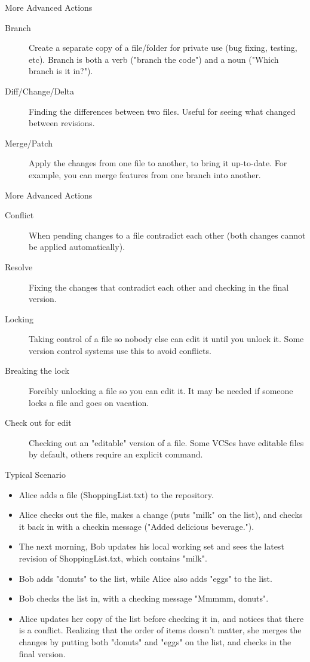 \begin{frame}{More Advanced Actions}
\begin{description}
\item[Branch] Create a separate copy of a file/folder for private
  use (bug fixing, testing, etc). Branch is both a verb ("branch the
  code") and a noun ("Which branch is it in?").
\item[Diff/Change/Delta] Finding the differences between two
  files. Useful for seeing what changed between revisions.
\item[Merge/Patch] Apply the changes from one file to another, to
  bring it up-to-date. For example, you can merge features from one
  branch into another.
\end{description}
\end{frame}
\begin{frame}{More Advanced Actions}
\begin{description}
\item[Conflict] When pending changes to a file contradict each
  other (both changes cannot be applied automatically).
\item[Resolve] Fixing the changes that contradict each other and
  checking in the final version.
\item[Locking] Taking control of a file so nobody else can edit
  it until you unlock it. Some version control systems use this to avoid
  conflicts.
\item[Breaking the lock] Forcibly unlocking a file so you can
  edit it. It may be needed if someone locks a file and goes on
  vacation.
\item[Check out for edit] Checking out an "editable" version of a
  file. Some VCSes have editable files by default, others require an
  explicit command.
\end{description}
\end{frame}

\begin{frame}{Typical Scenario}

\begin{itemize}
\item
  Alice adds a file (ShoppingList.txt) to the repository.
\item
  Alice checks out the file, makes a change (puts "milk" on the list),
  and checks it back in with a checkin message ("Added delicious
  beverage.").
\item
  The next morning, Bob updates his local working set and sees the
  latest revision of ShoppingList.txt, which contains "milk".
\item
  Bob adds "donuts" to the list, while Alice also adds "eggs" to the
  list.
\item
  Bob checks the list in, with a checking message "Mmmmm, donuts".
\item
  Alice updates her copy of the list before checking it in, and notices
  that there is a conflict. Realizing that the order of items doesn't
  matter, she merges the changes by putting both "donuts" and "eggs" on
  the list, and checks in the final version.
\end{itemize}
\end{frame}

